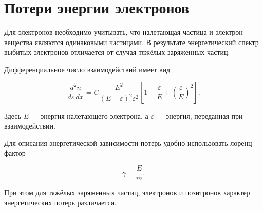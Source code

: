\documentclass[../final.tex]{subfiles}
\begin{document}
\ifSubfilesClassLoaded{\setcounter{chapter}{1}\setcounter{section}{5}}{}


\section{Потери энергии электронов}

Для электронов необходимо учитывать, что налетающая частица
и электрон вещества являются одинаковыми частицами.
В результате энергетический спектр выбитых электронов отличается
от случая тяжёлых заряженных частиц.

Дифференциальное число взаимодействий имеет вид

\begin{equation*}
    \frac{d^2n}{d\varepsilon\,dx}
    =
    C
    \frac{E^2}{(E-\varepsilon)^2\varepsilon^2}
    \left[
        1-\frac{\varepsilon}{E}
        +\left(\frac{\varepsilon}{E}\right)^2
    \right].
\end{equation*}

Здесь $E$ --- энергия налетающего электрона,
а $\varepsilon$ --- энергия, переданная при взаимодействии.

Для описания энергетической зависимости потерь удобно использовать
лоренц-фактор

\begin{equation*}
    \gamma=\frac{E}{m}.
\end{equation*}

При этом для тяжёлых заряженных частиц, электронов и позитронов
характер энергетических потерь различается.
\end{document}
